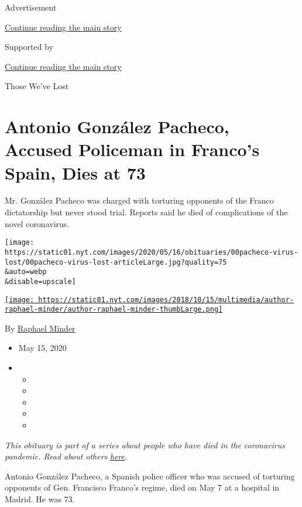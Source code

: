 Advertisement

\protect\hyperlink{after-top}{Continue reading the main story}

Supported by

\protect\hyperlink{after-sponsor}{Continue reading the main story}

Those We've Lost

\hypertarget{antonio-gonzuxe1lez-pacheco-accused-policeman-in-francos-spain-dies-at-73}{%
\section{Antonio González Pacheco, Accused Policeman in Franco's Spain,
Dies at
73}\label{antonio-gonzuxe1lez-pacheco-accused-policeman-in-francos-spain-dies-at-73}}

Mr. González Pacheco was charged with torturing opponents of the Franco
dictatorship but never stood trial. Reports said he died of
complications of the novel coronavirus.

\texttt{[image: https://static01.nyt.com/images/2020/05/16/obituaries/00pacheco-virus-lost/00pacheco-virus-lost-articleLarge.jpg?quality=75\\\&auto=webp\\\&disable=upscale]}

\href{https://www.nytimes.com/by/raphael-minder}{\texttt{[image: https://static01.nyt.com/images/2018/10/15/multimedia/author-raphael-minder/author-raphael-minder-thumbLarge.png]}}

By \href{https://www.nytimes.com/by/raphael-minder}{Raphael Minder}

\begin{itemize}
\item
  May 15, 2020
\item
  \begin{itemize}
  \item
  \item
  \item
  \item
  \item
  \end{itemize}
\end{itemize}

\emph{This obituary is part of a series about people who have died in
the coronavirus pandemic. Read about others}
\href{https://www.nytimes.com/series/people-who-have-died-of-the-coronavirus}{\emph{here}}\emph{.}

Antonio González Pacheco, a Spanish police officer who was accused of
torturing opponents of Gen. Francisco Franco's regime, died on May 7 at
a hospital in Madrid. He was 73.

